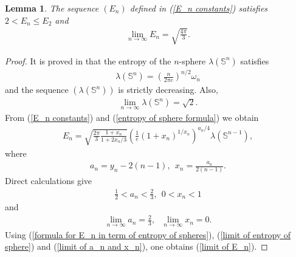 \documentclass[12pt]{amsart}
\numberwithin{equation}{section}
\newtheorem{lem}[thm]{Lemma}
\theoremstyle{remark}
\begin{document}
	\begin{lem} \label{properties of E_n lemma} 
		The sequence $(E_n)$ defined in (\ref{E_n constants}) satisfies $2<E_n \le E_2$ and
		\begin{align} \label{limit of E_n}
			\lim_{n\to \infty} E_n= \sqrt{\frac{4\pi}{3}}. 
		\end{align}
	\end{lem}
	\begin{proof} 
		It is proved in \cite[A.4 Lemma]{Stone} that the entropy of the $n$-sphere $\lambda (\mathbb{S}^n)$ satisfies 
		\begin{align} \label{entropy of sphere formula}
			\lambda (\mathbb{S}^n) = \left( \frac{n}{2\pi e}\right)^{n/2} \omega_n
		\end{align}
		and the sequence $(\lambda (\mathbb{S}^n) )$ is strictly decreasing. Also,  
		\begin{align} \label{limit of entropy of sphere}
			\lim_{n\to \infty} \lambda (\mathbb{S}^n) = \sqrt 2.
		\end{align}
		From (\ref{E_n constants}) and (\ref{entropy of sphere formula}) we obtain
		\begin{align} \label{formula for E_n in term of entropy of spheres}
			E_n = \sqrt{\frac{2\pi}{3} \frac{1 +x_n}{1 + 2x_n/3}} \left(\frac{1}{e} \left( 1 + x_n \right)^{1/x_n}\right)^{a_n /4} \lambda (\mathbb{S}^{n-1}),
		\end{align}
		where 
		\begin{align*}
			a_n = y_n - 2(n-1), \ \ x_n = \frac{a_n}{2(n-1)}. 
		\end{align*}
		Direct calculations give 
		\begin{align} \label{inequality for a_n and x_n} 
			\frac 12  < a_n <\frac 23 , \ \ 0<x_n <1
		\end{align}
		and 
		\begin{align} \label{limit of a_n and x_n}
			\lim_{n\to \infty} a_n = \frac{2}{3}, \ \ \ \lim_{n\to \infty} x_n = 0.
		\end{align}
		Using (\ref{formula for E_n in term of entropy of spheres}), (\ref{limit of entropy of sphere}) and (\ref{limit of a_n and x_n}), one obtains (\ref{limit of E_n}). 
		

\end{proof}
\end{document}
